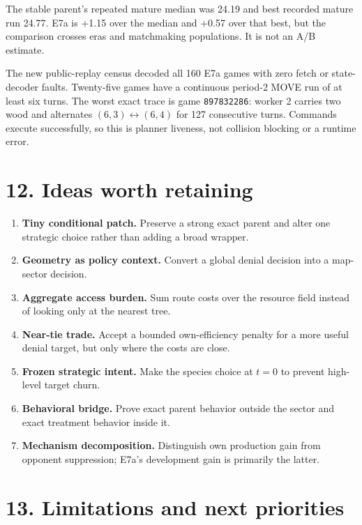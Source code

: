 \documentclass[10pt,a4paper]{article}
\begin{document}
The stable parent's repeated mature median was 24.19 and best recorded mature run 24.77.
E7a is +1.15 over the median and +0.57 over that best, but the comparison crosses eras and
matchmaking populations. It is not an A/B estimate.

The new public-replay census decoded all 160 E7a games with zero fetch or state-decoder
faults. Twenty-five games have a continuous period-2 MOVE run of at least six turns. The
worst exact trace is game \texttt{897832286}: worker 2 carries two wood and alternates
$(6,3)\leftrightarrow(6,4)$ for 127 consecutive turns. Commands execute successfully, so
this is planner liveness, not collision blocking or a runtime error.

\section*{12. Ideas worth retaining}

\begin{enumerate}
  \item \textbf{Tiny conditional patch.} Preserve a strong exact parent and alter one
        strategic choice rather than adding a broad wrapper.
  \item \textbf{Geometry as policy context.} Convert a global denial decision into a
        map-sector decision.
  \item \textbf{Aggregate access burden.} Sum route costs over the resource field instead
        of looking only at the nearest tree.
  \item \textbf{Near-tie trade.} Accept a bounded own-efficiency penalty for a more useful
        denial target, but only where the costs are close.
  \item \textbf{Frozen strategic intent.} Make the species choice at $t=0$ to prevent
        high-level target churn.
  \item \textbf{Behavioral bridge.} Prove exact parent behavior outside the sector and
        exact treatment behavior inside it.
  \item \textbf{Mechanism decomposition.} Distinguish own production gain from opponent
        suppression; E7a's development gain is primarily the latter.
\end{enumerate}

\section*{13. Limitations and next priorities}
\end{document}
